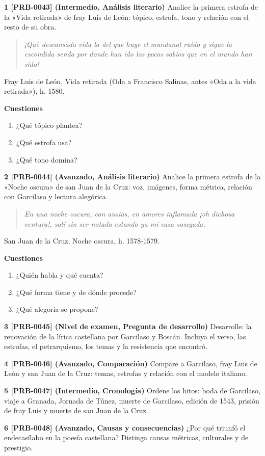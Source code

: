 \documentclass{book}
\begin{document}
\begin{tcolorbox}[title={Ejercicios}, studiumworked, breakable]

\noindent\textbf{1 [PRB-0043] (Intermedio, Análisis literario)}
Analice la primera estrofa de la «Vida retirada» de fray Luis de León: tópico, estrofa, tono y relación con el resto de su obra.


\begin{quote}
\itshape ¡Qué descansada vida la del que huye el mundanal ruido y sigue la escondida senda por donde han ido los pocos sabios que en el mundo han sido!
\end{quote}
{\noindent\footnotesize Fray Luis de León, Vida retirada (Oda a Francisco Salinas, antes «Oda a la vida retirada»), h. 1580.\par}

\noindent\textbf{Cuestiones}
\begin{enumerate}
\item ¿Qué tópico plantea?
\item ¿Qué estrofa usa?
\item ¿Qué tono domina?
\end{enumerate}

\noindent\textbf{2 [PRB-0044] (Avanzado, Análisis literario)}
Analice la primera estrofa de la «Noche oscura» de san Juan de la Cruz: voz, imágenes, forma métrica, relación con Garcilaso y lectura alegórica.


\begin{quote}
\itshape En una noche oscura, con ansias, en amores inflamada ¡oh dichosa ventura!, salí sin ser notada estando ya mi casa sosegada.
\end{quote}
{\noindent\footnotesize San Juan de la Cruz, Noche oscura, h. 1578-1579.\par}

\noindent\textbf{Cuestiones}
\begin{enumerate}
\item ¿Quién habla y qué cuenta?
\item ¿Qué forma tiene y de dónde procede?
\item ¿Qué alegoría se propone?
\end{enumerate}

\noindent\textbf{3 [PRB-0045] (Nivel de examen, Pregunta de desarrollo)}
Desarrolle: la renovación de la lírica castellana por Garcilaso y Boscán. Incluya el verso, las estrofas, el petrarquismo, los temas y la resistencia que encontró.


\noindent\textbf{4 [PRB-0046] (Avanzado, Comparación)}
Compare a Garcilaso, fray Luis de León y san Juan de la Cruz: temas, estrofas y relación con el modelo italiano.


\noindent\textbf{5 [PRB-0047] (Intermedio, Cronología)}
Ordene los hitos: boda de Garcilaso, viaje a Granada, Jornada de Túnez, muerte de Garcilaso, edición de 1543, prisión de fray Luis y muerte de san Juan de la Cruz.


\noindent\textbf{6 [PRB-0048] (Avanzado, Causas y consecuencias)}
¿Por qué triunfó el endecasílabo en la poesía castellana? Distinga causas métricas, culturales y de prestigio.

\end{tcolorbox}
\end{document}
